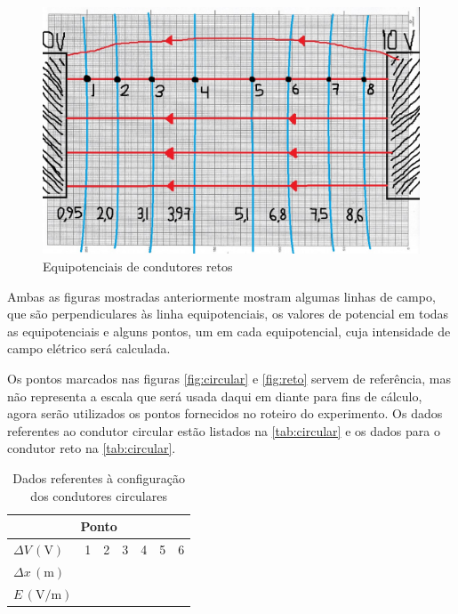 \documentclass[a4paper,12pt]{article}
\begin{document}
\begin{figure}[!h]
   \centering
   \caption{\label{fig:reto}Equipotenciais de condutores retos}
   \includegraphics[scale=0.4]{2}
\end{figure}

Ambas as figuras mostradas anteriormente mostram algumas linhas de campo, que são perpendiculares às linha equipotenciais, os valores de potencial em todas as equipotenciais e alguns pontos, um em cada equipotencial, cuja intensidade de campo elétrico será calculada.

Os pontos marcados nas figuras \autoref{fig:circular} e \autoref{fig:reto} servem de referência, mas não representa a escala que será usada daqui em diante para fins de cálculo, agora serão utilizados os pontos fornecidos no roteiro do experimento. Os dados referentes ao condutor circular estão listados na \autoref{tab:circular} e os dados para o condutor reto na \autoref{tab:circular}.

\begin{table}[!h]
   \centering
   \caption{\label{tab:circular}Dados referentes à configuração dos condutores circulares}
   \begin{tabular}{lcccccc}
     \hline
      \multicolumn{7}{c}{\textbf{Ponto}} \\
     \midrule
     \midrule
      $\Delta V \, (\mathrm{V})$ & 1 & 2 & 3 & 4 & 5 & 6 \\
      \midrule
     $\Delta x \, (\mathrm{m})$ &&&&&& \\
     \hline
      $E \, (\mathrm{V/m})$ &&&&&& \\
      \bottomrule
   \end{tabular}
   \vspace{1.7mm}

\end{table}
\end{document}
